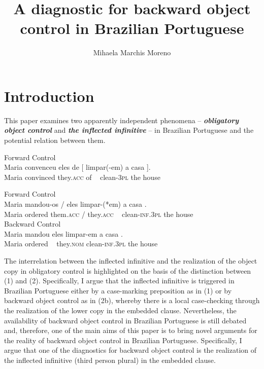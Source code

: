\documentclass[output=paper]{langsci/langscibook}
\author{Mihaela Marchis Moreno\affiliation{FCSH, Universidade Nova de Lisboa}}
\title{A diagnostic for backward object control in Brazilian Portuguese}
\begin{document}
\section{Introduction}%
This paper examines two apparently independent phenomena – \textbf{\textit{obligatory object control}} and \textbf{\textit{the inflected infinitive} }– in Brazilian Portuguese and the potential relation between them.

\ea%
         Forward Control\label{ex:moreno:1}\\
    \gll Maria convenceu eles  de    [  limpar(-em)   a     casa ].\\
         Maria convinced they.\textsc{acc} of ~  clean-\textsc{3pl}  the house\\
\z

\ea\label{ex:moreno:2}%
    \ea  Forward Control\\
    \gll Maria  mandou-os                   /   eles        {\ob}  limpar-(*em) a     casa {\cb}.   \\
         Maria {ordered  them.\textsc{acc}} /   they.\textsc{acc}   ~   clean-\textsc{inf.3pl} the house\\
    \glt
    \ex  Backward Control\\
    \gll Maria mandou {\ob}    eles    limpar-em     a     casa {\cb}.\\
         Maria  ordered  ~  they.\textsc{nom}      clean-\textsc{inf.3pl}          the house\\
        \z
\z

The interrelation between the inflected infinitive and the realization of the object copy in obligatory control is highlighted on the basis of the distinction between (1) and (2). Specifically, I argue that the inflected infinitive is triggered in Brazilian Portuguese either by a case-marking preposition as in (1) or by backward object control as in (2b), whereby there is a local case-checking through the realization of the lower copy in the embedded clause. Nevertheless, the availability of backward object control in Brazilian Portuguese is still debated and, therefore, one of the main aims of this paper is to bring novel arguments for the reality of backward object control in Brazilian Portuguese. Specifically, I argue that one of the diagnostics for backward object control is the realization of the inflected infinitive (third person plural) in the embedded clause.
\end{document}
